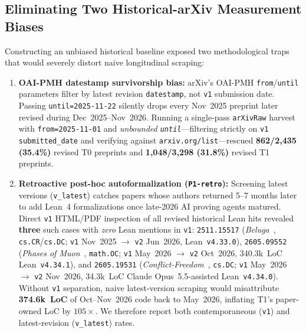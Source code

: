 \documentclass[11pt,letterpaper]{article}
\begin{document}
\subsection{Eliminating Two Historical-arXiv Measurement Biases}
Constructing an unbiased historical baseline exposed two methodological traps that would severely distort naive longitudinal scraping:
\begin{enumerate}
  \item \textbf{OAI-PMH datestamp survivorship bias:} arXiv's OAI-PMH \texttt{from}/\texttt{until} parameters filter by latest revision \texttt{datestamp}, not \texttt{v1} submission date. Passing \texttt{until=2025-11-22} silently drops every Nov~2025 preprint later revised during Dec~2025--Nov~2026. Running a single-pass \texttt{arXivRaw} harvest with \texttt{from=2025-11-01} and \emph{unbounded \texttt{until}}---filtering strictly on \texttt{v1} \texttt{submitted\_date} and verifying against \texttt{arxiv.org/list}---rescued \textbf{862/2,435 (35.4\%)} revised T0 preprints and \textbf{1,048/3,298 (31.8\%)} revised T1 preprints.
  \item \textbf{Retroactive post-hoc autoformalization (\texttt{P1-retro}):} Screening latest versions (\texttt{v\_latest}) catches papers whose authors returned 5--7 months later to add Lean~4 formalizations once late-2026 AI proving agents matured. Direct \texttt{v1} HTML/PDF inspection of all revised historical Lean hits revealed \textbf{three} such cases with \emph{zero} Lean mentions in \texttt{v1}: \texttt{2511.15517} (\emph{Beluga}~\cite{arxiv2511_15517}, \texttt{cs.CR}/\texttt{cs.DC}; \texttt{v1} Nov~2025 $\rightarrow$ \texttt{v2} Jun~2026, Lean~\texttt{v4.33.0}), \texttt{2605.09552} (\emph{Phases of Muon}~\cite{arxiv2605_09552}, \texttt{math.OC}; \texttt{v1} May~2026 $\rightarrow$ \texttt{v2} Oct~2026, 340.3k~LoC Lean~\texttt{v4.34.1}), and \texttt{2605.19531} (\emph{Conflict-Freedom}~\cite{arxiv2605_19531}, \texttt{cs.DC}; \texttt{v1} May~2026 $\rightarrow$ \texttt{v2} Nov~2026, 34.3k~LoC Claude Opus~5.5-assisted Lean~\texttt{v4.34.0}). Without \texttt{v1} separation, naive latest-version scraping would misattribute \textbf{374.6k~LoC} of Oct--Nov~2026 code back to May~2026, inflating T1's paper-owned LoC by $105\times$. We therefore report both contemporaneous (\texttt{v1}) and latest-revision (\texttt{v\_latest}) rates.
\end{enumerate}
\end{document}

